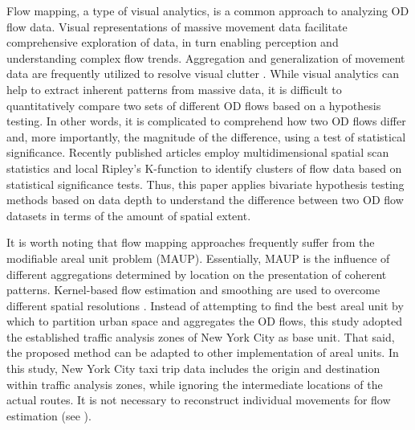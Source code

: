 \documentclass[a4paper,UKenglish]{lipics-v2018}
\begin{document}


Flow mapping, a type of visual analytics, is a common approach to analyzing OD flow data.
Visual representations of massive movement data facilitate comprehensive exploration of data, in turn enabling perception and understanding complex flow trends.
Aggregation and generalization of movement data are frequently utilized to resolve visual clutter \cite{guo14IEEETVCG}. %
While visual analytics can help to extract inherent patterns from massive data, it is difficult to quantitatively compare two sets of different OD flows based on a hypothesis testing.
In other words, it is complicated to comprehend how two OD flows differ and, more importantly, the magnitude of the difference, using a test of statistical significance.
Recently published articles employ multidimensional spatial scan statistics \cite{Gao17IJGIS} and local Ripley’s K-function \cite{tao16GA} to identify clusters of flow data based on statistical significance tests. Thus, this paper applies bivariate hypothesis testing methods based on data depth to understand the difference between two OD flow datasets in terms of the amount of spatial extent. 

It is worth noting that flow mapping approaches frequently suffer from the modifiable areal unit problem (MAUP). 
Essentially, MAUP is the influence of different aggregations determined by location on the presentation of coherent patterns.
Kernel-based flow estimation and smoothing are used to overcome different spatial resolutions \cite{guo14IEEETVCG}. 
Instead of attempting to find the best areal unit by which to partition urban space and aggregates the OD flows, this study adopted the established traffic analysis zones of New York City as base unit. That said, the proposed method can be adapted to other implementation of areal units. In this study, New York City taxi trip data includes the origin and destination within traffic analysis zones, while ignoring the intermediate locations of the actual routes.
It is not necessary to reconstruct individual movements for flow estimation (see \cite{duckham16ICGIS}).
\end{document}
